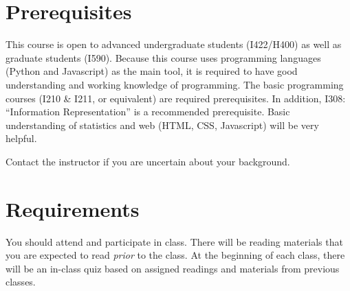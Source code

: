 \documentclass[11pt,article,oneside]{memoir}
\begin{document}



\section{Prerequisites}
\label{sec:Prerequisites}

This course is open to advanced undergraduate students (I422/H400) as well as
graduate students (I590). Because this course uses programming languages
(Python and Javascript) as the main tool, it is required to have good
understanding and working knowledge of programming.  The basic programming
courses (I210 \& I211, or equivalent) are required prerequisites. In addition,
I308: ``Information Representation'' is a recommended prerequisite. Basic
understanding of statistics and web (HTML, CSS, Javascript) will be very
helpful. 


Contact the instructor if you are uncertain about your background. 

\section{Requirements}
\label{sec:requirements}

You should attend and participate in class. There will be reading materials
that you are expected to read \emph{prior} to the class. At the beginning of
each class, there will be an in-class quiz based on assigned readings and
materials from previous classes.  
\end{document}
